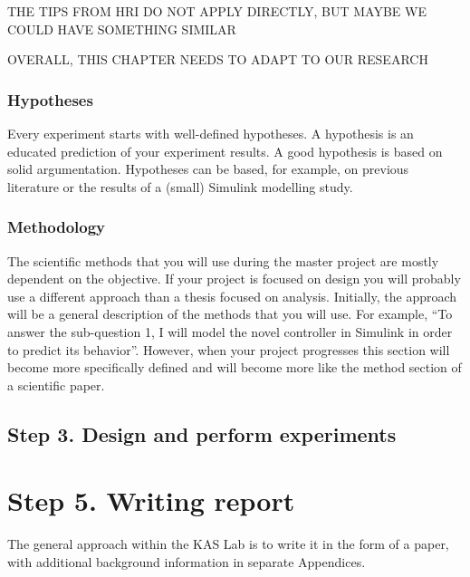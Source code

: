 THE TIPS FROM HRI DO NOT APPLY DIRECTLY, BUT MAYBE WE COULD HAVE SOMETHING SIMILAR

OVERALL, THIS CHAPTER NEEDS TO ADAPT TO OUR RESEARCH 


\subsubsection{Hypotheses}
Every experiment starts with well-defined hypotheses. A hypothesis is an educated prediction of your experiment results. A good hypothesis is based on solid argumentation. Hypotheses can be based, for example, on previous literature or the results of a (small) Simulink modelling study.


\subsubsection{Methodology}
The scientific methods that you will use during the master project are mostly dependent on the objective. If your project is focused on design you will probably use a different approach than a thesis focused on analysis.
Initially, the approach will be a general description of the methods that you will use. For example, “To answer the sub-question 1, I will model the novel controller in Simulink in order to predict its behavior”. However, when your project progresses this section will become more specifically defined and will become more like the method section of a scientific paper.

\subsection{Step 3. Design and perform experiments}




\section{Step 5. Writing report}
The general approach within the KAS Lab is to write it in the form of a paper, with additional background information in separate Appendices.

